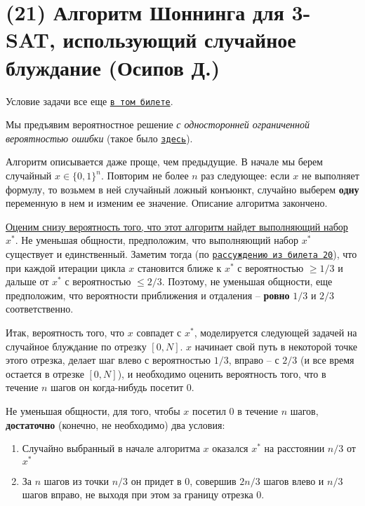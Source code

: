 \section{(21) Алгоритм Шоннинга для 3-SAT, использующий случайное блуждание (Осипов Д.)}

Условие задачи все еще \hyperlink{3sat}{\texttt{в том билете}}.

Мы предъявим вероятностное решение \textit{с односторонней ограниченной вероятностью ошибки} (такое было \hyperlink{Freivalds}{\texttt{здесь}}).


Алгоритм описывается даже проще, чем предыдущие. В начале мы берем случайный $x \in \{0, 1\}^n$. Повторим не более $n$ раз следующее: если $x$ не выполняет формулу, то возьмем в ней случайный ложный конъюнкт, случайно выберем \textbf{одну} переменную в нем и изменим ее значение. Описание алгоритма закончено.

\underline{Оценим снизу вероятность того, что этот алгоритм найдет выполняющий набор} $x^*$. Не уменьшая общности, предположим, что выполняющий набор $x^*$ существует и единственный. Заметим тогда (по \hyperlink{flip20}{\texttt{рассуждению из билета 20}}), что при каждой итерации цикла $x$ становится ближе к $x^*$ с вероятностью $\geq 1/3$ и дальше от $x^*$ с вероятностью $\leq 2/3$. Поэтому, не уменьшая общности, еще предположим, что вероятности приближения и отдаления -- \textbf{ровно} $1/3$ и $2/3$ соответственно.

Итак, вероятность того, что $x$ совпадет с $x^*$, моделируется следующей задачей на случайное блуждание по отрезку $[0, N]$. $x$ начинает свой путь в некоторой точке этого отрезка, делает шаг влево с вероятностью $1/3$, вправо -- с $2/3$ (и все время остается в отрезке $[0, N]$), и необходимо оценить вероятность того, что в течение $n$ шагов он когда-нибудь посетит 0.

Не уменьшая общности, для того, чтобы $x$ посетил 0 в течение $n$ шагов, \textbf{достаточно} (конечно, не необходимо) два условия:
\begin{enumerate}
    \item Случайно выбранный в начале алгоритма $x$ оказался $x^*$ на расстоянии $n/3$ от $x^*$
    \item За $n$ шагов из точки $n/3$ он придет в 0, совершив $2n/3$ шагов влево и $n/3$ шагов вправо, не выходя при этом за границу отрезка 0.
\end{enumerate}

